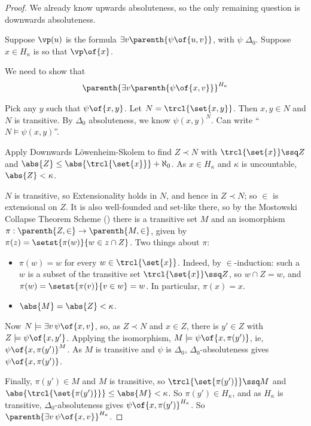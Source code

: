 \begin{proof}
    We already know upwards absoluteness, so the only remaining question is downwards absoluteness.

    Suppose $\vp(u)$ is the formula $\exists v\parenth{\psi\of{u, v}}$, with $\psi$ $\Delta_0$. Suppose $x \in H_{\kappa}$ is so that $\vp\of{x}$.

    We need to show that
    \begin{align*}
        \parenth{\exists v\parenth{\psi\of{x, v}}}^{H_{\kappa}}
    \end{align*}

    Pick any $y$ such that $\psi\of{x, y}$. Let $N = \trcl{\set{x, y}}$. Then $x, y \in N$ and $N$ is transitive. By $\Delta_0$ absoluteness, we know $\psi(x, y)^N$. Can write ``$N \models \psi(x, y)$''.

    Apply Downwards Löwenheim-Skolem to find $Z \prec N$ with $\trcl{\set{x}} \ssq Z$ and $\abs{Z} \leq \abs{\trcl{\set{x}}} + \aleph_0$. As $x \in H_{\kappa}$ and $\kappa$ is uncountable, $\abs{Z} < \kappa$.

    $N$ is transitive, so Extensionality holds in $N$, and hence in $Z \prec N$; so $\in$ is extensional on $Z$. It is also well-founded and set-like there, so by the Mostowski Collapse Theorem Scheme () there is a transitive set $M$ and an isomorphism $\pi : \parenth{Z, \in} \to \parenth{M, \in}$, given by $\pi(z) = \setst{\pi(w)}{w \in z \cap Z}$. Two things about $\pi$:
    \begin{itemize}
        \item $\pi(w) = w$ for every $w \in \trcl{\set{x}}$. Indeed, by $\in$-induction: such a $w$ is a subset of the transitive set $\trcl{\set{x}} \ssq Z$, so $w \cap Z = w$, and $\pi(w) = \setst{\pi(v)}{v \in w} = w$. In particular, $\pi(x) = x$.
        \item $\abs{M} = \abs{Z} < \kappa$.
    \end{itemize}

    Now $N \models \exists v \, \psi\of{x, v}$, so, as $Z \prec N$ and $x \in Z$, there is $y' \in Z$ with $Z \models \psi\of{x, y'}$. Applying the isomorphism, $M \models \psi\of{x, \pi(y')}$, ie, $\psi\of{x, \pi(y')}^M$. As $M$ is transitive and $\psi$ is $\Delta_0$, $\Delta_0$-absoluteness gives $\psi\of{x, \pi(y')}$.

    Finally, $\pi(y') \in M$ and $M$ is transitive, so $\trcl{\set{\pi(y')}} \ssq M$ and $\abs{\trcl{\set{\pi(y')}}} \leq \abs{M} < \kappa$. So $\pi(y') \in H_{\kappa}$, and as $H_{\kappa}$ is transitive, $\Delta_0$-absoluteness gives $\psi\of{x, \pi(y')}^{H_{\kappa}}$. So $\parenth{\exists v \, \psi\of{x, v}}^{H_{\kappa}}$.
\end{proof}

